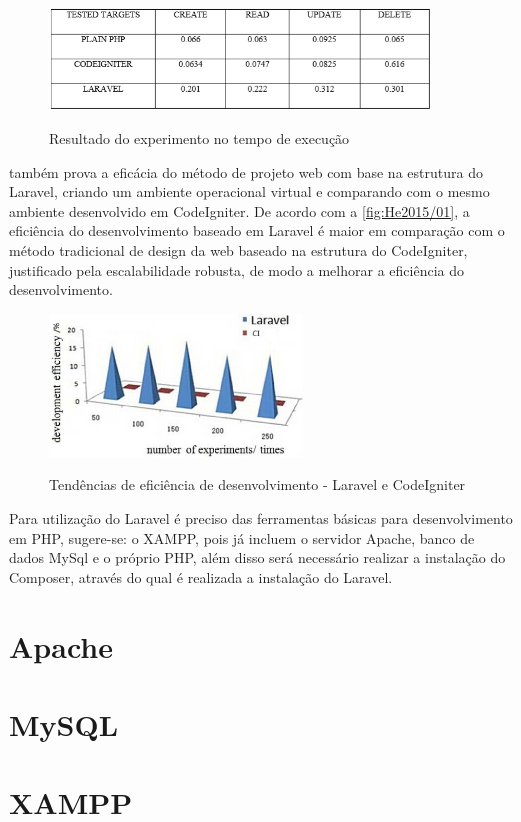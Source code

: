 \begin{figure}[H]
    \centering
    \caption{Resultado do experimento no tempo de execução}
    \includegraphics[width=0.9\textwidth]{./dados/figuras/fig8}
    \label{fig:comparisonLaravel}
\end{figure}

 também prova a eficácia do método de projeto web com base na estrutura do Laravel, criando um ambiente operacional virtual e comparando com o mesmo ambiente desenvolvido em CodeIgniter. De acordo com a \autoref{fig:He2015/01}, a eficiência do desenvolvimento baseado em Laravel é maior em comparação com o método tradicional de design da web baseado na estrutura do CodeIgniter, justificado pela escalabilidade robusta, de modo a melhorar a eficiência do desenvolvimento.

\begin{figure}[H]
    \centering
    \caption{Tendências de eficiência de desenvolvimento - Laravel e CodeIgniter}
    \includegraphics[width=0.6\textwidth]{./dados/figuras/fig9}
    \label{fig:He2015/01}
\end{figure}

Para utilização do Laravel é preciso das ferramentas básicas para desenvolvimento em PHP, sugere-se: o XAMPP, pois já incluem o servidor Apache, banco de dados MySql e o próprio PHP, além disso será necessário realizar a instalação do Composer, através do qual é realizada a instalação do Laravel.

\section{Apache}

\section{MySQL}

\section{XAMPP}
